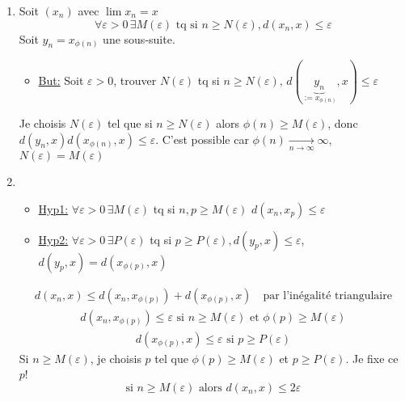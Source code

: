 \documentclass[a4paper]{report}
\let\epsilon\varepsilon
\theoremstyle{definition}
\begin{document}
\begin{preuve}
   \begin{enumerate}
       \item Soit $(x_n)$ avec  $\lim x_n = x$
            \[
                \forall \epsilon > 0 \, \exists M(\epsilon) \text{ tq si } n \ge N(\epsilon), d(x_n ,x) \le \epsilon 
           \] 
           Soit $y_n = x_{\phi(n)}$ une sous-suite.
           \begin{itemize}
               \item \underline{But:} Soit $\epsilon > 0$, trouver $N(\epsilon)$ tq si  $n \ge  N(\epsilon), \, d(\underbrace{y_n}_{:= x_{\phi(n)}}, x) \le \epsilon$
           \end{itemize}
           Je choisis $N(\epsilon)$ tel que si  $n \ge N(\epsilon)$ alors $\phi(n) \ge M(\epsilon)$, donc $d(y_n, x) d(x_{\phi(n)}, x) \le  \epsilon$. C'est possible car $\phi(n) \xrightarrow[n \to \infty]{} \infty$, $N(\epsilon) = M(\epsilon)$ 
        \item 
            \begin{itemize}
                \item  \underline{Hyp1:} $\forall \epsilon > 0 \, \exists M(\epsilon)$ tq si $n, p \ge M(\epsilon)$ $d(x_n, x_p) \le \epsilon$
                \item  \underline{Hyp2:} $\forall \epsilon > 0 \, \exists P(\epsilon)$ tq si $p \ge P(\epsilon), d(y_p, x) \le \epsilon$, $d(y_p, x) = d(x_{\phi(p)}, x)$
            \end{itemize}
            \begin{align*}
                d(x_n, x) \le d(x_n, x_{\phi(p)}) + d(x_{\phi(p)}, x) \quad \text{par l'inégalité triangulaire}
            \end{align*}
            \begin{align*}
                d(x_n, x_{\phi(p)}) \le \epsilon \text{ si } n \ge M(\epsilon) \text{ et } \phi(p) \ge M(\epsilon)
            \end{align*}
            \begin{align*}
                d(x_{\phi(p)}, x) \le \epsilon \text{ si } p \ge P(\epsilon)
            \end{align*}
            Si $n \ge M(\epsilon)$, je choisis $p$ tel que  $\phi(p) \ge  M(\epsilon)$ et $p \ge P(\epsilon)$. Je fixe ce $p$!
             \[
            \text{si } n \ge M(\epsilon) \text{ alors } d(x_n, x) \le 2\epsilon
            \] 
   \end{enumerate} 
\end{preuve}
\end{document}
